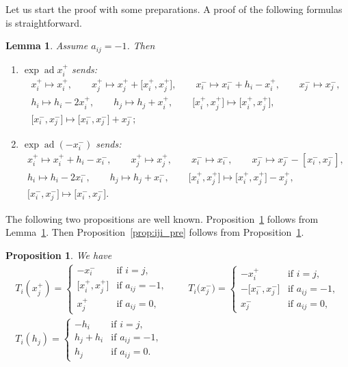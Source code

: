 \documentclass[pdftex]{sigma}
\newtheorem{prop}[thm]{Proposition}
\newtheorem{lem}[thm]{Lemma}
\theoremstyle{definition}
\numberwithin{equation}{section}
\DeclareMathOperator{\ad}{ad}
\begin{document}
Let us start the proof with some preparations. A proof of the following formulas is straightforward.
\begin{lem}\label{lem:expad1} Assume $a_{ij}=-1$. Then
\begin{enumerate}\itemsep=0pt
\item $\exp\ad x_{i}^{+}$ sends:
\begin{gather*}
x_i^+ \mapsto x_i^+, \qquad x_j^+ \mapsto x_j^+ + \big[x_i^+,x_j^+\big],\qquad x_i^- \mapsto x_i^-+h_i-x_i^+, \qquad x_j^- \mapsto x_j^-,\\
h_i \mapsto h_i-2x_i^+,\qquad h_j \mapsto h_j+x_i^+,\qquad \big[x_i^+,x_j^+\big] \mapsto \big[x_i^+,x_j^+\big],\\
 \big[x_i^-,x_j^-\big] \mapsto \big[x_i^-,x_j^-\big] + x_j^-;
\end{gather*}
\item $\exp\ad (-x_{i}^{-})$ sends:
\begin{gather*}
x_i^+ \mapsto x_i^++h_i-x_i^-, \qquad x_j^+ \mapsto x_j^+,\qquad x_i^- \mapsto x_i^-, \qquad x_j^- \mapsto x_j^--[x_i^-,x_j^-],\\
h_i \mapsto h_i-2x_i^-,\qquad h_j \mapsto h_j+x_i^-,\qquad \big[x_i^+,x_j^+\big] \mapsto \big[x_i^+,x_j^+\big]-x_j^+,\\
 \big[x_i^-,x_j^-\big] \mapsto \big[x_i^-,x_j^-\big].
\end{gather*}
\end{enumerate}
\end{lem}

The following two propositions are well known. Proposition~\ref{prop:formula1} follows from Lemma~\ref{lem:expad1}. Then Proposition~\ref{prop:iji_pre} follows from Proposition~\ref{prop:formula1}.
\begin{prop}\label{prop:formula1} We have
\begin{gather*}
T_i(x_j^+) = \begin{cases}
-x_i^- & \text{if $i=j$},\\
\big[x_i^+,x_j^+\big] & \text{if $a_{ij}=-1$},\\
x_j^+ & \text{if $a_{ij}=0$},
\end{cases}\qquad
T_i\big(x_j^-\big) = \begin{cases}
-x_i^+ & \text{if $i=j$},\\
-\big[x_i^-,x_j^-\big] & \text{if $a_{ij}=-1$},\\
x_j^- & \text{if $a_{ij}=0$},
\end{cases}
\\
T_i(h_j) = \begin{cases}
-h_i & \text{if $i=j$},\\
h_j + h_i & \text{if $a_{ij}=-1$},\\
h_j & \text{if $a_{ij}=0$}.
\end{cases}
\end{gather*}
\end{prop}
\end{document}

